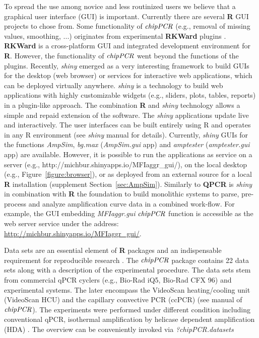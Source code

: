 \documentclass[twocolumn]{bmcart}%
\begin{document}
To spread the use among novice and less routinized users we believe that a 
graphical user interface (GUI) is important. Currently there are several 
\textbf{R} GUI projects \cite{Valero_2012} to chose from. Some functionality of 
$\emph{chipPCR}$ (e.g., removal of missing values, smoothing, ...) originates 
from experimental \textbf{RKWard} plugins \cite{roediger_bead_qPCR_2013, 
roediger_RKWard_2013}. \textbf{RKWard} \cite{rodiger_rkward_2012} is a 
cross-platform GUI and integrated development environment for \textbf{R}. 
However, the functionality of $\emph{chipPCR}$ went beyond the functions of the 
plugins. Recently, \emph{shiny} emerged as a very interesting framework to build 
GUIs for the desktop (web browser) or services for interactive web applications, 
which can be deployed virtually anywhere. \emph{shiny} is a technology to build 
web applications with highly customizable widgets (e.g., sliders, plots, tables, 
reports) in a plugin-like approach. The combination \textbf{R} and \emph{shiny} 
technology allows a simple and repaid extension of the software. The 
\emph{shiny} applications update live and interactively. The user interfaces can 
be built entirely using R and operates in any R environment (see \emph{shiny} 
manual for details). Currently, \emph{shiny} GUIs for the functions 
\textsl{AmpSim}, \textsl{bg.max} (\textsl{AmpSim.gui} app) and 
\textsl{amptester} (\textsl{amptester.gui} app) are available. However, it is 
possible to run the applications as service on a server (e.g., 
http://michbur.shinyapps.io/MFIaggr_gui/), on the local desktop (e.g., 
Figure~\ref{figure:browser}), or as deployed from an external source for a local 
\textbf{R} installation 
(supplement Section~\ref{sec:AmpSim}). Similarly to 
\textbf{QPCR} \cite{pabinger_2009} is \emph{shiny} in combination with 
\textbf{R} the foundation to build monolithic systems to parse, pre-process and 
analyze amplification curve data in a combined work-flow. For example, the GUI 
embedding \textsl{MFIaggr.gui} $\emph{chipPCR}$ function is accessible as the 
web server service under the address:
\url{http://michbur.shinyapps.io/MFIaggr_gui/}.

Data sets are an essential element of \textbf{R} packages \cite{hofmann_2013} 
and an indispensable requirement for reproducible research \cite{Leeper_2014}. 
The $\emph{chipPCR}$ package contains 22 data sets along with a description of 
the experimental procedure. The data sets stem from commercial qPCR cyclers 
(e.g., Bio-Rad iQ5, Bio-Rad CFX 96) and experimental systems. The later 
encompass the VideoScan heating/cooling unit (VideoScan HCU) 
\cite{roediger_highly_2013} and the capillary convective PCR (ccPCR) (see 
manual 
of $\emph{chipPCR}$). The experiments were performed under different condition 
including conventional qPCR, isothermal amplification by helicase dependent 
amplification (HDA) \cite{rodiger_nucleic_2014}. The overview can be 
conveniently invoked via \textsl{?chipPCR.datasets}
\end{document}
